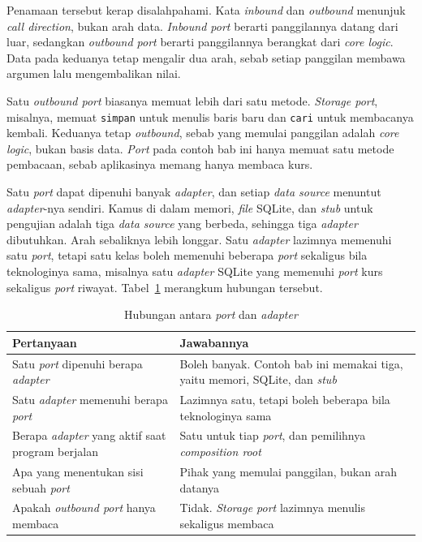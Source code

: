 Penamaan tersebut kerap disalahpahami. Kata \textit{inbound} dan
\textit{outbound} menunjuk \textit{call direction}, bukan arah data.
\textit{Inbound port} berarti panggilannya datang dari luar, sedangkan
\textit{outbound port} berarti panggilannya berangkat dari \textit{core logic}.
Data pada keduanya tetap mengalir dua arah, sebab setiap panggilan membawa
argumen lalu mengembalikan nilai.

Satu \textit{outbound port} biasanya memuat lebih dari satu metode.
\textit{Storage port}, misalnya, memuat \texttt{simpan} untuk menulis baris
baru dan \texttt{cari} untuk membacanya kembali. Keduanya tetap
\textit{outbound}, sebab yang memulai panggilan adalah \textit{core logic},
bukan basis data. \textit{Port} pada contoh bab ini hanya memuat satu metode
pembacaan, sebab aplikasinya memang hanya membaca kurs.

Satu \textit{port} dapat dipenuhi banyak \textit{adapter}, dan setiap
\textit{data source} menuntut \textit{adapter}-nya sendiri. Kamus di dalam
memori, \textit{file} SQLite, dan \textit{stub} untuk
pengujian adalah tiga
\textit{data source} yang berbeda, sehingga tiga \textit{adapter} dibutuhkan.
Arah sebaliknya lebih longgar. Satu \textit{adapter} lazimnya memenuhi satu
\textit{port}, tetapi satu kelas boleh memenuhi beberapa \textit{port}
sekaligus bila teknologinya sama, misalnya satu \textit{adapter} SQLite yang
memenuhi \textit{port} kurs sekaligus \textit{port} riwayat.
Tabel~\ref{tab:port-adapter-tanya} merangkum hubungan tersebut.

\begin{table}[htbp]
  \centering
  \caption{Hubungan antara \textit{port} dan \textit{adapter}}
  \label{tab:port-adapter-tanya}
  \begin{tabularx}{\textwidth}{|X|X|}
    \hline
    \textbf{Pertanyaan} & \textbf{Jawabannya} \\
    \hline
    Satu \textit{port} dipenuhi berapa \textit{adapter} & Boleh banyak. Contoh bab ini memakai tiga, yaitu memori, SQLite, dan \textit{stub} \\
    \hline
    Satu \textit{adapter} memenuhi berapa \textit{port} & Lazimnya satu, tetapi boleh beberapa bila teknologinya sama \\
    \hline
    Berapa \textit{adapter} yang aktif saat program berjalan & Satu untuk tiap \textit{port}, dan pemilihnya \textit{composition root} \\
    \hline
    Apa yang menentukan sisi sebuah \textit{port} & Pihak yang memulai panggilan, bukan arah datanya \\
    \hline
    Apakah \textit{outbound port} hanya membaca & Tidak. \textit{Storage port} lazimnya menulis sekaligus membaca \\
    \hline
  \end{tabularx}
\end{table}

